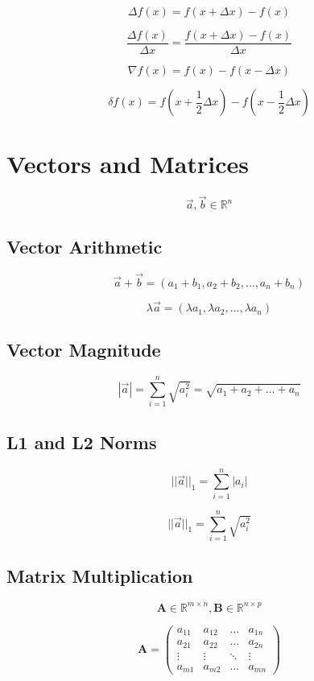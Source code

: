 \documentclass[a4paper]{article}
\begin{document}
$$ \Delta f(x) = f\left(x+\Delta x\right) - f(x) $$

$$ \frac{\Delta f(x)}{\Delta x} = \frac{f\left(x+\Delta x\right) - f(x)}{\Delta x} $$

$$ \nabla f(x) = f(x) - f\left(x - \Delta x\right) $$

$$ \delta f(x) = f\left(x+\frac{1}{2}\Delta x\right) - f\left(x - \frac{1}{2}\Delta x\right) $$

\section{Vectors and Matrices}

$$ \vec{a}, \vec{b} \in \mathbb{R}^n $$

\subsection{Vector Arithmetic}

$$ \vec{a} + \vec{b} = (a_1+b_1, a_2+b_2, \ldots, a_n+b_n) $$

$$ \lambda\vec{a} = (\lambda a_1, \lambda a_2,\ldots, \lambda a_n) $$

\subsection{Vector Magnitude}

$$ |\vec{a}| = \sum_{i=1}^{n}\sqrt{a_i^2} = \sqrt{a_1 + a_2 + \ldots + a_n} $$

\subsection{L1 and L2 Norms}

$$ ||\vec{a}||_1 = \sum_{i=1}^{n} |a_i| $$

$$ ||\vec{a}||_1 = \sum_{i=1}^{n} \sqrt{a_i^2} $$

\subsection{Matrix Multiplication}

$$ \mathbf{A} \in \mathbb{R}^{m \times n}, \mathbf{B} \in \mathbb{R}^{n \times p} $$

$$ \mathbf{A} = 
\begin{pmatrix}
a_{11} & a_{12} & \ldots & a_{1n} \\
a_{21} & a_{22} & \ldots & a_{2n} \\
\vdots & \vdots & \ddots & \vdots \\
a_{m1} & a_{m2} & \ldots & a_{mn}
\end{pmatrix}
$$
\end{document}
